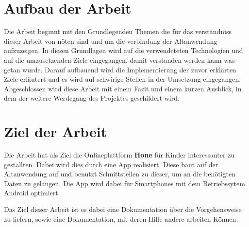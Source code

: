 \section{Aufbau der Arbeit}

Die Arbeit beginnt mit den Grundlegenden Themen die für das verständniss dieser Arbeit von nöten sind und um die verbindung der Altanwendung aufzuzeigen. In diesen Grundlagen wird auf die verwendeteten Technologien und auf die umzusetzenden Ziele eingegangen, damit verstanden werden kann was getan wurde. Darauf aufbauend wird die Implementierung der zuvor erklärten Ziele erläutert und es wird auf schwirige Stellen in der Umsetzung eingegangen. Abgeschlossen wird diese Arbeit mit einem Fazit und einem kurzen Ausblick, in dem der weitere Werdegang des Projektes geschildert wird.

\section{Ziel der Arbeit}

Die Arbeit hat als Ziel die Onlineplattform \textbf{Hone} für Kinder interessanter zu gestallten. Dabei wird dies durch eine App realisiert. Diese baut auf der Altanwendung auf und benutzt Schnittstellen zu dieser, um an die benötigten Daten zu gelangen. Die App wird dabei für Smartphones mit dem Betriebssytem Android optimiert.

Das Ziel dieser Arbeit ist es dabei eine Dokumentation über die Vorgehensweise zu liefern, sowie eine Dokumentation, mit deren Hilfe andere arbeiten Können.